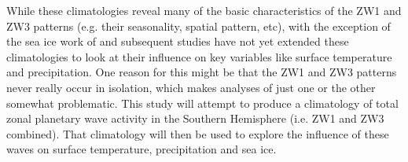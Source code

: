 While these climatologies reveal many of the basic characteristics of the ZW1 and ZW3 patterns (e.g. their seasonality, spatial pattern, etc), with the exception of the sea ice work of \citet{Raphael2007} and \citet{Raphael2014} subsequent studies have not yet extended these climatologies to look at their influence on key variables like surface temperature and precipitation. One reason for this might be that the ZW1 and ZW3 patterns never really occur in isolation, which makes analyses of just one or the other somewhat problematic. This study will attempt to produce a climatology of total zonal planetary wave activity in the Southern Hemisphere (i.e. ZW1 and ZW3 combined). That climatology will then be used to explore the influence of these waves on surface temperature, precipitation and sea ice.
